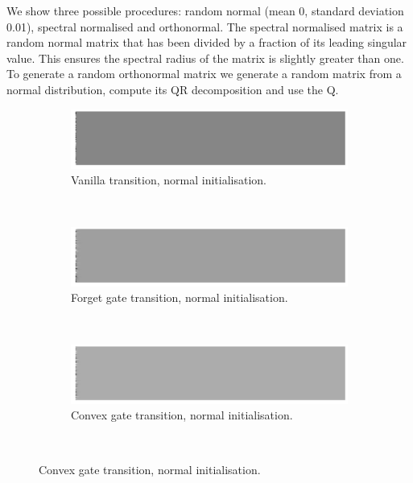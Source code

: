We show three possible procedures: random normal (mean 0, standard deviation 0.01), spectral
normalised and orthonormal. The spectral normalised matrix is a random normal matrix that
has been divided by a fraction of its leading singular value. This ensures the spectral
radius of the matrix is slightly greater than one. To generate a random orthonormal matrix
we generate a random matrix from a normal distribution, compute its QR decomposition and use the
Q.

\begin{figure}
\centering
\begin{subfigure}[t]{0.3\textwidth}
\includegraphics[width=\textwidth]{appendix/init/vanillanormal}
\caption{Vanilla transition, normal initialisation.}
\end{subfigure}~
\begin{subfigure}[t]{0.3\textwidth}
\includegraphics[width=\textwidth]{appendix/init/lstmnormal}
\caption{Forget gate transition, normal initialisation.}
\end{subfigure}~
\begin{subfigure}[t]{0.3\textwidth}
\includegraphics[width=\textwidth]{appendix/init/grunormal}
\caption{Convex gate transition, normal initialisation.}
\end{subfigure}\\


\end{figure}
